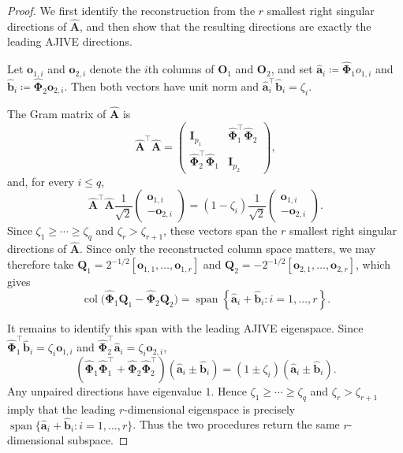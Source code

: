 \documentclass[11pt]{article}
\newcommand{\trans}{\top}
\begin{document}
\begin{proof}
We first identify the reconstruction from the $r$ smallest right singular
directions of $\widehat{\bm A}$, and then show that the resulting directions
are exactly the leading AJIVE directions.

Let $\bm o_{1,i}$ and $\bm o_{2,i}$ denote the $i$th columns of
$\bm O_1$ and $\bm O_2$, and set
$\widehat{\bm a}_i\coloneqq\widehat{\bm\Phi}_1 o_{1,i}$ and
$\widehat{\bm b}_i\coloneqq\widehat{\bm\Phi}_2\bm o_{2,i}$.
Then both vectors have unit norm and
$\widehat{\bm a}_i^\trans\widehat{\bm b}_i=\zeta_i$.

The Gram matrix of $\widehat{\bm A}$ is
\[
  \widehat{\bm A}^\trans\widehat{\bm A}
  =
  \begin{pmatrix}
    \bm I_{p_1}
    &
    \widehat{\bm\Phi}_1^\trans\widehat{\bm\Phi}_2
    \\
    \widehat{\bm\Phi}_2^\trans\widehat{\bm\Phi}_1
    &
    \bm I_{p_2}
  \end{pmatrix},
\]
and, for every $i\le q$,
\[
  \widehat{\bm A}^\trans\widehat{\bm A}
  \frac{1}{\sqrt2}
  \begin{pmatrix}
    \bm o_{1,i}\\
    -\bm o_{2,i}
  \end{pmatrix}
  =
  (1-\zeta_i)
  \frac{1}{\sqrt2}
  \begin{pmatrix}
    \bm o_{1,i}\\
    -\bm o_{2,i}
  \end{pmatrix}.
\]
Since $\zeta_1\ge\cdots\ge\zeta_q$ and
$\zeta_r>\zeta_{r+1}$, these vectors span the $r$ smallest right singular
directions of $\widehat{\bm A}$.  Since only the reconstructed column space
matters, we may therefore take
$\bm Q_1=2^{-1/2}[\bm o_{1,1},\ldots,\bm o_{1,r}]$ and
$\bm Q_2=-2^{-1/2}[\bm o_{2,1},\ldots,\bm o_{2,r}]$, which gives
\[
  \operatorname{col}
  \bigl(
    \widehat{\bm\Phi}_1\bm Q_1
    -
    \widehat{\bm\Phi}_2\bm Q_2
  \bigr)
  =
  \operatorname{span}
  \left\{
    \widehat{\bm a}_i+\widehat{\bm b}_i:
    i=1,\ldots,r
  \right\}.
\]

It remains to identify this span with the leading AJIVE eigenspace.  Since
$\widehat{\bm\Phi}_1^\trans\widehat{\bm b}_i
=\zeta_i\bm o_{1,i}$ and
$\widehat{\bm\Phi}_2^\trans\widehat{\bm a}_i
=\zeta_i\bm o_{2,i}$,
\[
  \left(
    \widehat{\bm\Phi}_1\widehat{\bm\Phi}_1^\trans
    +
    \widehat{\bm\Phi}_2\widehat{\bm\Phi}_2^\trans
  \right)
  (\widehat{\bm a}_i\pm\widehat{\bm b}_i)
  =
  (1\pm\zeta_i)
  (\widehat{\bm a}_i\pm\widehat{\bm b}_i).
\]
Any unpaired directions have eigenvalue $1$.  Hence
$\zeta_1\ge\cdots\ge\zeta_q$ and
$\zeta_r>\zeta_{r+1}$ imply that the leading $r$-dimensional eigenspace is
precisely
$\operatorname{span}\{
\widehat{\bm a}_i+\widehat{\bm b}_i:i=1,\ldots,r\}$.
Thus the two procedures return the same $r$-dimensional subspace.
\end{proof}
\end{document}
